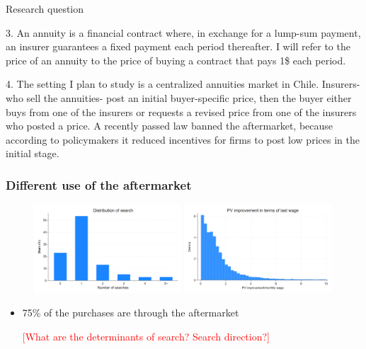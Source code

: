 \documentclass[10pt,aspectratio=169]{beamer}
\begin{document}
\begin{frame}{Research question}
{3. An annuity is a financial contract where, in exchange for a lump-sum payment, an insurer guarantees a fixed payment each period thereafter. I will refer to the price of an annuity to the price of buying a contract that pays 1\$ each period.

4. The setting I plan to study is a centralized annuities market in Chile. Insurers- who sell the annuities- post an initial buyer-specific price, then the buyer either buys from one of the insurers or requests a revised price from one of the insurers who posted a price. A recently passed law banned the aftermarket, because according to policymakers it reduced incentives for firms to post low prices in the initial stage. 
}

\end{frame}

\begin{frame}\frametitle{Different use of the aftermarket}\label{slide:single_fig}
\begin{figure}
    \centering
    \includegraphics[width=0.49\textwidth]{../figures/IE3_dist_external_offers.png}
    \hfill 
    \includegraphics[width=0.49\textwidth]{../figures/IE3_offer_improvement_histogram.png}
\end{figure}

\begin{itemize}
    \item   75\% of the purchases are through the aftermarket 
     \hyperlink{slide:fig4}{} 
    
    \textcolor{red}{[What are the determinants of search? Search direction?] }
\end{itemize}


\end{frame}
\end{document}
